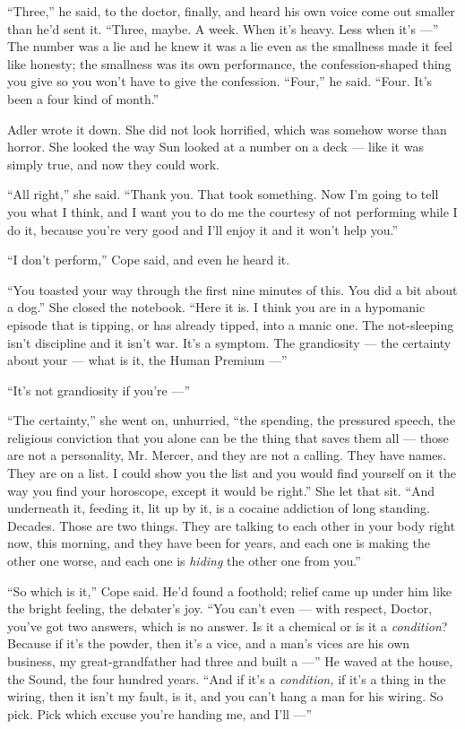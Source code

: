\documentclass[11pt,openany]{book}
\begin{document}
``Three,'' he said, to the doctor, finally, and heard his own voice come out smaller than he'd sent it. ``Three, maybe. A week. When it's heavy. Less when it's ---'' The number was a lie and he knew it was a lie even as the smallness made it feel like honesty; the smallness was its own performance, the confession-shaped thing you give so you won't have to give the confession. ``Four,'' he said. ``Four. It's been a four kind of month.''

Adler wrote it down. She did not look horrified, which was somehow worse than horror. She looked the way Sun looked at a number on a deck --- like it was simply true, and now they could work.

``All right,'' she said. ``Thank you. That took something. Now I'm going to tell you what I think, and I want you to do me the courtesy of not performing while I do it, because you're very good and I'll enjoy it and it won't help you.''

``I don't perform,'' Cope said, and even he heard it.

``You toasted your way through the first nine minutes of this. You did a bit about a dog.'' She closed the notebook. ``Here it is. I think you are in a hypomanic episode that is tipping, or has already tipped, into a manic one. The not-sleeping isn't discipline and it isn't war. It's a symptom. The grandiosity --- the certainty about your --- what is it, the Human Premium ---''

``It's not grandiosity if you're ---''

``The certainty,'' she went on, unhurried, ``the spending, the pressured speech, the religious conviction that you alone can be the thing that saves them all --- those are not a personality, Mr. Mercer, and they are not a calling. They have names. They are on a list. I could show you the list and you would find yourself on it the way you find your horoscope, except it would be right.'' She let that sit. ``And underneath it, feeding it, lit up by it, is a cocaine addiction of long standing. Decades. Those are two things. They are talking to each other in your body right now, this morning, and they have been for years, and each one is making the other one worse, and each one is \textit{hiding} the other one from you.''

``So which is it,'' Cope said. He'd found a foothold; relief came up under him like the bright feeling, the debater's joy. ``You can't even --- with respect, Doctor, you've got two answers, which is no answer. Is it a chemical or is it a \textit{condition}? Because if it's the powder, then it's a vice, and a man's vices are his own business, my great-grandfather had three and built a ---'' He waved at the house, the Sound, the four hundred years. ``And if it's a \textit{condition,} if it's a thing in the wiring, then it isn't my fault, is it, and you can't hang a man for his wiring. So pick. Pick which excuse you're handing me, and I'll ---''
\end{document}
